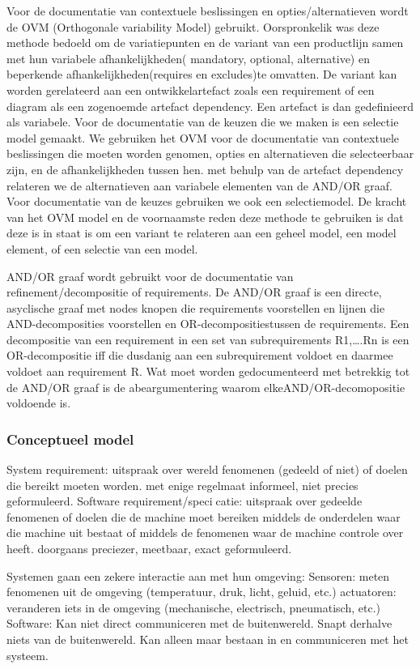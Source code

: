 Voor de documentatie van contextuele beslissingen en opties/alternatieven wordt de OVM (Orthogonale variability Model) gebruikt. Oorspronkelik was deze methode bedoeld om de variatiepunten en de variant van een productlijn samen met hun variabele afhankelijkheden( mandatory, optional, alternative)  en beperkende afhankelijkheden(requires en excludes)te omvatten. De variant kan worden gerelateerd aan een ontwikkelartefact zoals een requirement of een diagram als een zogenoemde artefact dependency. Een artefact is dan gedefinieerd als variabele. Voor de documentatie van de keuzen die we maken is een selectie model gemaakt. We gebruiken het OVM voor de documentatie van contextuele beslissingen die moeten worden genomen, opties en alternatieven die selecteerbaar zijn, en de afhankelijkheden tussen hen. met behulp van de artefact dependency relateren we de alternatieven aan variabele elementen van de AND/OR graaf. Voor documentatie van de keuzes gebruiken we ook een selectiemodel. De kracht van het OVM model en de voornaamste reden deze methode te gebruiken is dat deze is in staat is om een variant te relateren aan een geheel model, een model element, of een selectie van een model. 

AND/OR graaf wordt gebruikt voor de documentatie van refinement/decompositie of requirements. De AND/OR graaf is een directe, asyclische graaf met nodes knopen die requirements voorstellen en lijnen die AND-decomposities voorstellen en OR-decompositiestussen de requirements. Een decompositie van een requirement in een set van subrequirements R1,….Rn is een OR-decompositie iff die dusdanig aan een subrequirement voldoet en daarmee voldoet aan requirement R. Wat moet worden gedocumenteerd met betrekkig tot de AND/OR graaf is de abeargumentering waarom elkeAND/OR-decomopositie  voldoende is. 
\subsubsection{Conceptueel model}



System requirement:
uitspraak over wereld fenomenen (gedeeld of niet) of doelen
die bereikt moeten worden.
met enige regelmaat informeel, niet precies geformuleerd.
Software requirement/specicatie:
uitspraak over gedeelde fenomenen of doelen die de machine
moet bereiken middels de onderdelen waar die machine uit
bestaat of middels de fenomenen waar de machine controle
over heeft.
doorgaans preciezer, meetbaar, exact geformuleerd.


Systemen gaan een zekere interactie aan met hun omgeving:
Sensoren: meten fenomenen uit de omgeving (temperatuur,
druk, licht, geluid, etc.)
actuatoren: veranderen iets in de omgeving (mechanische,
electrisch, pneumatisch, etc.)
Software:
Kan niet direct communiceren met de buitenwereld.
Snapt derhalve niets van de buitenwereld.
Kan alleen maar bestaan in en communiceren met het
systeem.


